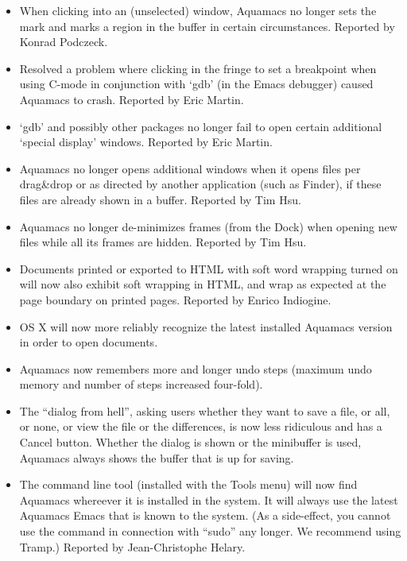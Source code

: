 \begin{itemize}
\item When clicking into an (unselected) window, Aquamacs no longer sets the mark and marks a region in the buffer in certain circumstances.
Reported by Konrad Podczeck.

\item Resolved a problem where clicking in the fringe to set a breakpoint when using C-mode in conjunction with `gdb' (in the Emacs debugger) caused Aquamacs to crash.
Reported by Eric Martin.

\item `gdb' and possibly other packages no longer fail to open certain additional `special display' windows.
Reported by Eric Martin.

\item Aquamacs no longer opens additional windows when it opens files per drag\&drop or as directed by another application (such as Finder), if these files are already shown in a buffer.
Reported by Tim Hsu.

\item Aquamacs no longer de-minimizes frames (from the Dock) when opening new files while all its frames are hidden.
Reported by Tim Hsu.

\item Documents printed or exported to HTML with soft word wrapping turned on will now also exhibit soft wrapping in HTML, and wrap as expected at the page boundary on printed pages.
Reported by Enrico Indiogine.

\item OS X will now more reliably recognize the latest installed Aquamacs version in order to open documents.

\item Aquamacs now remembers more and longer undo steps (maximum undo memory and number of steps increased four-fold).

\item The ``dialog from hell'', asking users whether they want to save a file, or all, or none, or view the file or the differences, is now less ridiculous and has a Cancel button.  Whether the dialog is shown or the minibuffer is used,  Aquamacs always shows the buffer that is up for saving.

\item The command line tool (installed with the Tools menu) will now find Aquamacs whereever it is installed in the system.  It will always use the latest Aquamacs Emacs that is known to the system.  (As a side-effect, you cannot use the command in connection with ``sudo'' any longer.  We recommend using Tramp.)
Reported by Jean-Christophe Helary.


\end{itemize}
